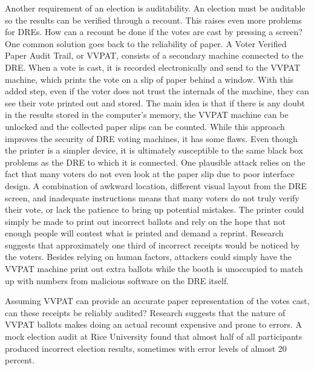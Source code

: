 \documentclass[12pt, titlepage]{article}
\begin{document}
Another requirement of an election is auditability. An election must be auditable so the results can be verified through a recount. This raises even more problems for DREs. How can a recount be done if the votes are cast by pressing a screen? One common solution goes back to the reliability of paper. A Voter Verified Paper Audit Trail, or VVPAT, consists of a secondary machine connected to the DRE. When a vote is cast, it is recorded electronically and send to the VVPAT machine, which prints the vote on a slip of paper behind a window. With this added step, even if the voter does not trust the internals of the machine, they can see their vote printed out and stored. The main idea is that if there is any doubt in the results stored in the computer's memory, the VVPAT machine can be unlocked and the collected paper slips can be counted. While this approach improves the security of DRE voting machines, it has some flaws. Even though the printer is a simpler device, it is ultimately susceptible to the same black box problems as the DRE to which it is connected. One plausible attack relies on the fact that many voters do not even look at the paper slip due to poor interface design. A combination of awkward location, different visual layout from the DRE screen, and inadequate instructions means that many voters do not truly verify their vote, or lack the patience to bring up potential mistakes. \cite{selker2004security} The printer could simply be made to print out incorrect ballots and rely on the hope that not enough people will contest what is printed and demand a reprint. Research suggests that approximately one third of incorrect receipts would be noticed by the voters. \cite{selker2004security} Besides relying on human factors, attackers could simply have the VVPAT machine print out extra ballots while the booth is unoccupied to match up with numbers from malicious software on the DRE itself.

Assuming VVPAT can provide an accurate paper representation of the votes cast, can these receipts be reliably audited? Research suggests that the nature of VVPAT ballots makes doing an actual recount expensive and prone to errors. A mock election audit at Rice University found that almost half of all participants produced incorrect election results, sometimes with error levels of almost 20 percent. \cite{goggin2007examination}
\end{document}
